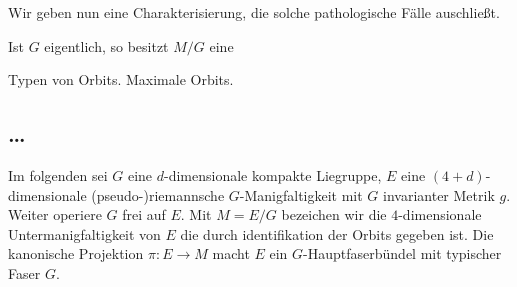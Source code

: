 Wir geben nun eine Charakterisierung, die solche pathologische
Fälle auschließt. 
\begin{theorem}
Ist $G$ eigentlich, so besitzt $M/G$ eine  
\end{theorem}
Typen von Orbits. Maximale Orbits.
\begin{theorem}
\end{theorem}
\begin{theorem}
\end{theorem}
\subsection{\ldots}
Im folgenden sei $G$ eine $d$-dimensionale kompakte Liegruppe, $E$ eine
$(4+d)$-dimensionale (pseudo-)riemannsche $G$-Manigfaltigkeit mit $G$
invarianter Metrik $g$. Weiter operiere $G$ frei auf $E$. Mit $M=E/G$ bezeichen
wir die $4$-dimensionale Untermanigfaltigkeit von $E$ die durch identifikation
der Orbits gegeben ist. Die kanonische Projektion $\pi:E\to M$ macht $E$ ein
$G$-Hauptfaserbündel mit typischer Faser $G$.
